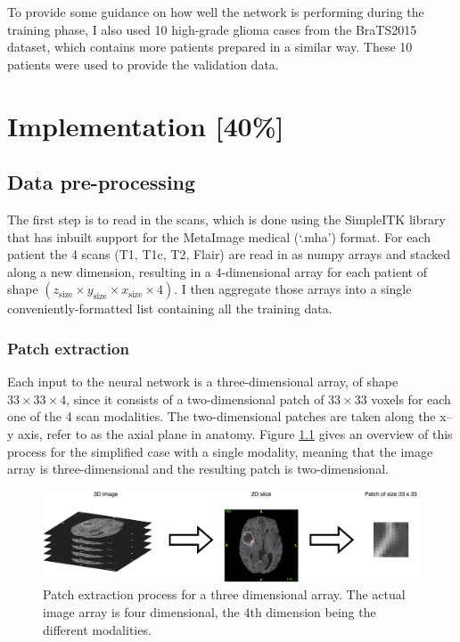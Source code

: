 \documentclass[12pt,a4paper,twoside,openright]{report}
\begin{document}
To provide some guidance on how well the network is performing during the training phase, I also used 10 high-grade glioma cases from the BraTS2015 dataset, which contains more patients prepared in a similar way. These 10 patients were used to provide the validation data.

\chapter{Implementation [40\%]}

\section{Data pre-processing}
\label{section:pre-processing}
The first step is to read in the scans, which is done using the SimpleITK library that has inbuilt support for the MetaImage medical (`.mha') format. For each patient the 4 scans (T1, T1c, T2, Flair) are read in as numpy arrays and stacked along a new dimension, resulting in a 4-dimensional array for each patient of shape $(z_{\text{size}} \times y_{\text{size}} \times x_{\text{size}} \times 4)$. I then aggregate those arrays into a single conveniently-formatted list containing all the training data.

\subsection{Patch extraction}
Each input to the neural network is a three-dimensional array, of shape $33 \times 33 \times 4$, since it consists of a two-dimensional patch of $33 \times 33$ voxels for each one of the 4 scan modalities. The two-dimensional patches are taken along the x--y axis, refer to as the axial plane in anatomy. Figure \ref{fig:patch_extraction} gives an overview of this process for the simplified case with a single modality, meaning that the image array is three-dimensional and the resulting patch is two-dimensional.

\begin{figure}[h]
	\centering
	\includegraphics[width=\textwidth]{patch_extraction}
	\caption[Patch extraction process for a three dimensional array.]{Patch extraction process for a three dimensional array. The actual image array is four dimensional, the 4th dimension being the different modalities.}
	\label{fig:patch_extraction}
\end{figure}
\end{document}
